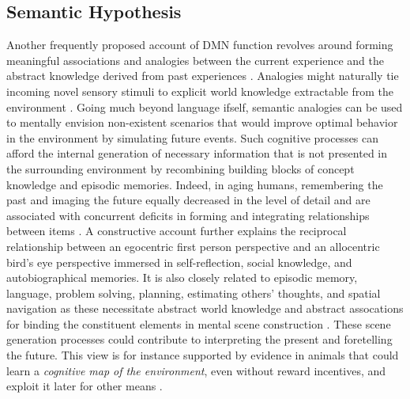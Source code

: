 \documentclass{article} %
\begin{document}
\subsection{Semantic Hypothesis}
Another frequently proposed account of DMN function revolves
around forming meaningful associations and analogies between
the current experience and
the abstract knowledge derived from past experiences
\cite{bar2007proactive, binder1999conceptual}.
Analogies might naturally tie incoming novel sensory stimuli to
explicit world knowledge extractable from the environment
\cite{bar2009proactive}.
%
Going much beyond language ifself,
semantic analogies can be used to mentally envision non-existent scenarios
that would improve optimal behavior in the environment
by simulating future events.
Such cognitive processes can afford
the internal generation of necessary information
that is not presented in the surrounding environment
by recombining building blocks of
concept knowledge and episodic memories.
Indeed, in aging humans, remembering the past and imaging the future
equally decreased in the level of detail and are associated with
concurrent deficits in forming and integrating relationships between
items \cite{addis2008age, spreng2006temporal}.
A constructive account further explains the reciprocal relationship
between an egocentric first person perspective and
an allocentric bird’s eye perspective immersed in
self-reflection, social knowledge, and autobiographical memories.
%
It is also closely related to episodic memory, language, problem solving,
planning, estimating others' thoughts, and spatial navigation
as these necessitate abstract world knowledge and abstract assocations
for binding the constituent elements in mental scene construction
\cite{schacter2007remembering}.
These scene generation processes could contribute to interpreting the
present and foretelling the future.
This view is for instance supported by evidence in animals that
could learn a \textit{cognitive map of the environment},
even without reward incentives, and exploit it later
for other means \cite{tolman1948cognitive}.
\end{document}
